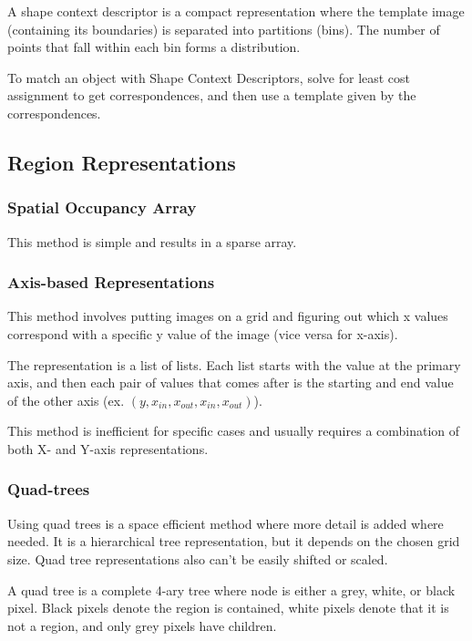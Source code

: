 \documentclass{article}
\begin{document}
\begin{multicols}{2}
A shape context descriptor is a compact representation where the template image (containing its boundaries) is separated into partitions (bins). The number of points that fall within each bin forms a distribution.

To match an object with Shape Context Descriptors, solve for least cost assignment to get correspondences, and then use a template given by the correspondences.

\subsection{Region Representations}
\subsubsection{Spatial Occupancy Array}

This method is simple and results in a sparse array.

\subsubsection{Axis-based Representations}

This method involves putting images on a grid and figuring out which x values correspond with a specific y value of the image (vice versa for x-axis). 

The representation is a list of lists. Each list starts with the value at the primary axis, and then each pair of values that comes after is the starting and end value of the other axis (ex. $(y, x_{in}, x_{out}, x_{in}, x_{out})$).

This method is inefficient for specific cases and usually requires a combination of both X- and Y-axis representations.

\subsubsection{Quad-trees}

Using quad trees is a space efficient method where more detail is added where needed. It is a hierarchical tree representation, but it depends on the chosen grid size. Quad tree representations also can't be easily shifted or scaled.

A quad tree is a complete 4-ary tree where node is either a grey, white, or black pixel. Black pixels denote the region is contained, white pixels denote that it is not a region, and only grey pixels have children. 


\end{multicols}
\end{document}
